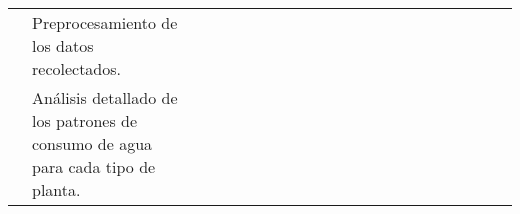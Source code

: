 \begin{landscape}
\begin{ThreePartTable}
\begin{longtable}{|p{}|p{5.5cm}|p{5.5cm}|l|l|l|l|l|l|l|l|l|l|l|l|l|l|l|l|l|l|l|}
      \cline{2-2}\cline{4-21}
                                                                                                                                                                                               & Preprocesamiento de los datos recolectados.                                                &                                                                                                                  &                                       &                                       & \cellcolor{magenta!70}               &                                       &                        &                        &                        &                        &                        &                        &                        &                        &                        &                        &                        \\
      \cline{2-2}\cline{4-21}
                                                                                                                                                                                               & Análisis detallado de los patrones de consumo de agua para cada tipo de planta.            &                                                                                                                  &                                       &                                       &                                      & \cellcolor{magenta!70}                &                        &                        &                        &                        &                        &                        &                        &                        &                        &                        &                        \\
      \cline{2-2}\cline{4-21}


\end{longtable}
\end{ThreePartTable}
\end{landscape}

